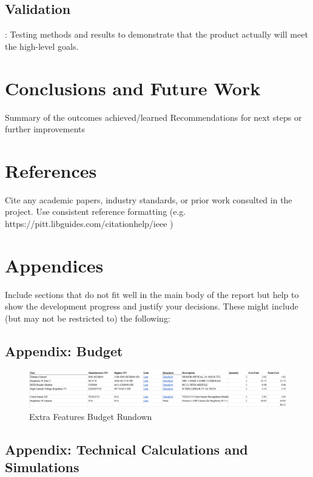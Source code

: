 \documentclass{article}
\begin{document}
\subsection{Validation}: Testing methods and results to demonstrate that the product actually will meet the high-level goals.

\section{Conclusions and Future Work}
Summary of the outcomes achieved/learned
Recommendations for next steps or further improvements


\section{References}
Cite any academic papers, industry standards, or prior work consulted in the project. Use consistent reference
formatting (e.g. https://pitt.libguides.com/citationhelp/ieee )


\section{Appendices}
Include sections that do not fit well in the main body of the report but help to show the development progress and justify your decisions. These might include (but may not be restricted to) the following:

\subsection{Appendix: Budget}

\begin{figure}[H]
    \centering
    \includegraphics[width=1\textwidth]{Figures/financials.png}
    \caption{Extra Features Budget Rundown}
    \label{fig:financials}
\end{figure}

\subsection{Appendix: Technical Calculations and Simulations}
\end{document}
